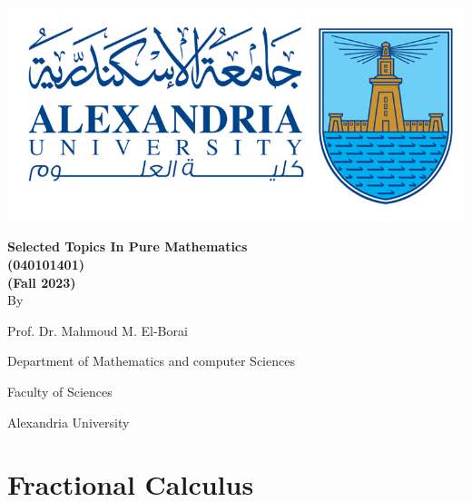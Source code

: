 \documentclass[]{article}
\begin{document}
\newpage
\setcounter{page}{1}
\begingroup
{}
\begin{center}
    \includegraphics[scale=.5]{collage logo.png}
    \vspace*{1.5cm}
    \par
    {\fontsize{20pt}{30pt}\selectfont
        \textbf{Selected Topics In Pure Mathematics\\(040101401)\\(Fall 2023)}
        \\
        \vspace*{.75cm}
        By
        \vspace*{.75cm}

        Prof. Dr. Mahmoud M. El-Borai

        Department of Mathematics and computer Sciences

        Faculty of Sciences

        Alexandria University
    }
\end{center}
\restoregeometry
\endgroup
\newpage
\tableofcontents
\newpage



\section{Fractional Calculus}
\end{document}
